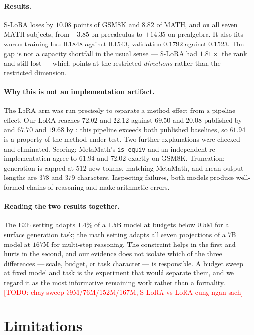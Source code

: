 \documentclass{article}
\theoremstyle{remark}
\newcommand{\TODO}[1]{\textcolor{red}{[TODO: #1]}}
\begin{document}
\paragraph{Results.}
S-LoRA loses by $10.08$ points of GSM8K and $8.82$ of MATH, and on all seven
MATH subjects, from $+3.85$ on precalculus to $+14.35$ on prealgebra. It also
fits worse: training loss $0.1848$ against $0.1543$, validation $0.1792$
against $0.1523$. The gap is not a capacity shortfall in the usual sense ---
S-LoRA had $1.81\times$ the rank and still lost --- which points at the
restricted \emph{directions} rather than the restricted dimension.

\paragraph{Why this is not an implementation artifact.}
The LoRA arm was run precisely to separate a method effect from a pipeline
effect. Our LoRA reaches $72.02$ and $22.12$ against $69.50$ and $20.08$
published by \citet{meng2024pissa} and $67.70$ and $19.68$ by
\citet{wang2025pmss}: this pipeline exceeds both published baselines, so
$61.94$ is a property of the method under test. Two further explanations were
checked and eliminated. Scoring: MetaMath's \texttt{is\_equiv} and an
independent re-implementation agree to $61.94$ and $72.02$ exactly on GSM8K.
Truncation: generation is capped at $512$ new tokens, matching MetaMath, and
mean output lengths are $378$ and $379$ characters. Inspecting failures, both
models produce well-formed chains of reasoning and make arithmetic errors.

\paragraph{Reading the two results together.}
The E2E setting adapts $1.4\%$ of a $1.5$B model at budgets below $0.5$M for a
surface generation task; the math setting adapts all seven projections of a
$7$B model at $167$M for multi-step reasoning. The constraint helps in the
first and hurts in the second, and our evidence does not isolate which of the
three differences --- scale, budget, or task character --- is responsible. A
budget sweep at fixed model and task is the experiment that would separate
them, and we regard it as the most informative remaining work rather than a
formality. \TODO{chay sweep 39M/76M/152M/167M, S-LoRA vs LoRA cung ngan sach}

\section{Limitations}
\end{document}
